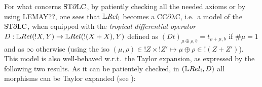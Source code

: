 %
%



For what concerns $\mathrm{ST}\partial\mathrm{LC}$, by patiently checking all the needed axioms {\color{red}or by using  LEMAY??}, one sees that
 $\LREL_!$ becomes a CC$\partial\lambda$C, i.e.\ a model of the $\mathrm{ST}\partial\mathrm{LC}$, when equipped with the \emph{tropical differential operator} $D:\HOM{\LREL}{!X}{Y}\to \HOM{\LREL}{!(X+X)}{Y}$ defined as $(Dt)_{\mu\oplus\rho,b}=t_{\rho+\mu,b}$ if $\#\mu=1$ and as $\infty$ otherwise (using the iso $(\mu,\rho)\in !Z\times !Z'\mapsto\mu\oplus\rho \in !(Z+Z')$).
This model is also well-behaved w.r.t.\ the Taylor expansion, as expressed by the following two results.
As it can be patientely checked, in $(\LREL_!,D)$ all morphisms can be Taylor expanded  (see \cite[Definition 4.22]{Manzo2012}):

